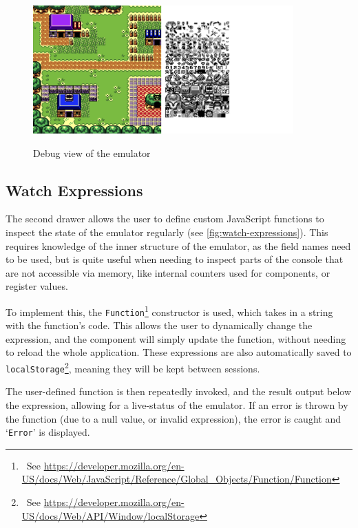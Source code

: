 \documentclass[11pt]{informatics-report}
\newcommand{\ftnt}[1]{\footnote{~See \url{#1}}}
\begin{document}
\begin{figure}[h]
    \centering
    \includegraphics[width=10cm]{images/debug-view}\\
    \caption{Debug view of the emulator}
    \label{fig:debug-view}
\end{figure}

\subsection{Watch Expressions}

The second drawer allows the user to define custom JavaScript functions to inspect the state of the emulator regularly (see \ref{fig:watch-expressions}). This requires knowledge of the inner structure of the emulator, as the field names need to be used, but is quite useful when needing to inspect parts of the console that are not accessible via memory, like internal counters used for components, or register values.

To implement this, the \texttt{Function}\ftnt{https://developer.mozilla.org/en-US/docs/Web/JavaScript/Reference/Global_Objects/Function/Function} constructor is used, which takes in a string with the function's code. This allows the user to dynamically change the expression, and the component will simply update the function, without needing to reload the whole application. These expressions are also automatically saved to \texttt{localStorage}\ftnt{https://developer.mozilla.org/en-US/docs/Web/API/Window/localStorage}, meaning they will be kept between sessions.

The user-defined function is then repeatedly invoked, and the result output below the expression, allowing for a live-status of the emulator. If an error is thrown by the function (due to a null value, or invalid expression), the error is caught and `\texttt{Error}' is displayed.
\end{document}
